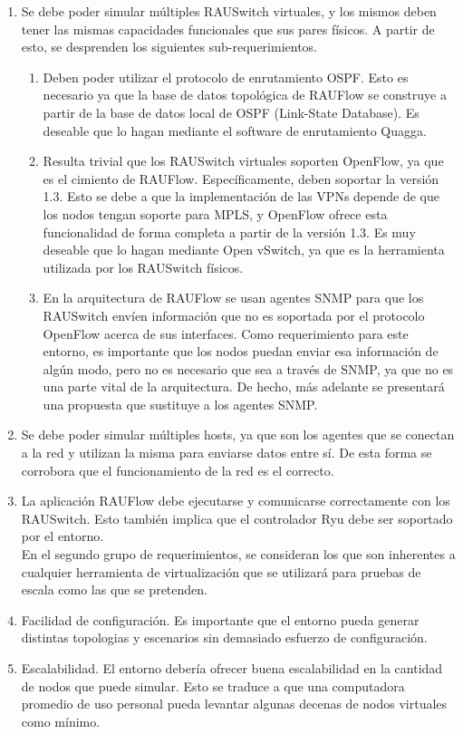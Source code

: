\begin{enumerate}
	\item Se debe poder simular múltiples RAUSwitch virtuales, y los mismos deben tener las mismas capacidades funcionales que sus pares físicos. A partir de esto, se desprenden los siguientes sub-requerimientos.
	\begin{enumerate}
		\item Deben poder utilizar el protocolo de enrutamiento OSPF. Esto es necesario ya que la base de datos topológica de RAUFlow se construye a partir de la base de datos local de OSPF (Link-State Database).  Es deseable que lo hagan mediante el software de enrutamiento Quagga.
		\item Resulta trivial que los RAUSwitch virtuales soporten OpenFlow, ya que es el cimiento de RAUFlow. Específicamente, deben soportar la versión 1.3. Esto se debe a que la implementación de las VPNs depende de que los nodos tengan soporte para MPLS, y OpenFlow ofrece esta funcionalidad de forma completa a partir de la versión 1.3. Es muy deseable que lo hagan mediante Open vSwitch, ya que es la herramienta utilizada por los RAUSwitch físicos.
		\item En la arquitectura de RAUFlow se usan agentes SNMP para que los RAUSwitch envíen información que no es soportada por el protocolo OpenFlow acerca de sus interfaces. Como requerimiento para este entorno, es importante que los nodos puedan enviar esa información de algún modo, pero no es necesario que sea a través de SNMP, ya que no es una parte vital de la arquitectura. De hecho, más adelante se presentará una propuesta que sustituye a los agentes SNMP.
	\end{enumerate}
	\item Se debe poder simular múltiples hosts, ya que son los agentes que se conectan a la red y utilizan la misma para enviarse datos entre sí. De esta forma se corrobora que el funcionamiento de la red es el correcto.
	\item La aplicación RAUFlow debe ejecutarse y comunicarse correctamente con los RAUSwitch. Esto también implica que el controlador Ryu debe ser soportado por el entorno. \\

En el segundo grupo de requerimientos, se consideran los que son inherentes a cualquier herramienta de virtualización que se utilizará para pruebas de escala como las que se pretenden.
 
	\item Facilidad de configuración. Es importante que el entorno pueda generar distintas topologias y escenarios sin demasiado esfuerzo de configuración.
	\item Escalabilidad. El entorno debería ofrecer buena escalabilidad en la cantidad de nodos que puede simular. Esto se traduce a que una computadora promedio de uso personal pueda levantar algunas decenas de nodos virtuales como mínimo.
\end{enumerate}

